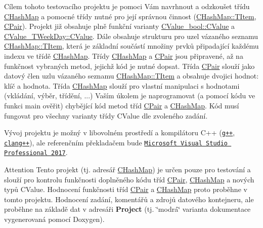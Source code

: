 Cílem tohoto testovacího projektu je pomoci Vám navrhnout a odzkoušet třídu {\ttfamily \hyperlink{class_c_hash_map}{C\+Hash\+Map}} a pomocné třídy nutné pro její správnou činnost ({\ttfamily \hyperlink{struct_c_hash_map_1_1_t_item}{C\+Hash\+Map\+::\+T\+Item}}, {\ttfamily \hyperlink{class_c_pair}{C\+Pair}}). Projekt již obsahuje plně funkční varianty {\ttfamily \hyperlink{class_c_value__bool_1_1_c_value}{C\+Value\+\_\+bool\+::\+C\+Value}} a {\ttfamily \hyperlink{class_c_value___t_week_day_1_1_c_value}{C\+Value\+\_\+\+T\+Week\+Day\+::\+C\+Value}}. Dále obsahuje strukturu pro uzel vázaného seznamu {\ttfamily \hyperlink{struct_c_hash_map_1_1_t_item}{C\+Hash\+Map\+::\+T\+Item}}, která je základní součástí množiny prvků připadající každému indexu ve třídě {\ttfamily \hyperlink{class_c_hash_map}{C\+Hash\+Map}}. Třídy {\ttfamily \hyperlink{class_c_hash_map}{C\+Hash\+Map}} a {\ttfamily \hyperlink{class_c_pair}{C\+Pair}} jsou připravené, až na funkčnost vybraných metod, jejichž kód je nutné dopsat. Třída {\ttfamily \hyperlink{class_c_pair}{C\+Pair}} slouží jako datový člen uzlu vázaného seznamu {\ttfamily \hyperlink{struct_c_hash_map_1_1_t_item}{C\+Hash\+Map\+::\+T\+Item}} a obsahuje dvojici hodnot\+: klíč a hodnota. Třída {\ttfamily \hyperlink{class_c_hash_map}{C\+Hash\+Map}} slouží pro vlastní manipulaci s hodnotami (vkládání, výběr, třídění, ...) Vaším úkolem je naprogramovat (a pomocí kódu ve funkci main ověřit) chybějící kód metod tříd {\ttfamily \hyperlink{class_c_pair}{C\+Pair}} a {\ttfamily \hyperlink{class_c_hash_map}{C\+Hash\+Map}}. Kód musí fungovat pro všechny varianty třídy C\+Value dle zvoleného zadání.

Vývoj projektu je možný v libovolném prostředí a kompilátoru C++ (\href{http://gcc.gnu.org/}{\tt g++}, \href{http://clang.llvm.org/}{\tt clang++}), ale referenčním překladačem bude \href{http://www.visualstudio.com/}{\tt Microsoft Visual Studio Professional 2017}.

\begin{DoxyAttention}{Attention}
Tento projekt (tj. adresář \hyperlink{class_c_hash_map}{C\+Hash\+Map}) je určen pouze pro testování a slouží pro kontrolu funkčnosti doplněného kódu tříd {\ttfamily \hyperlink{class_c_pair}{C\+Pair}}, {\ttfamily \hyperlink{class_c_hash_map}{C\+Hash\+Map}} a nových typů {\ttfamily C\+Value}. Hodnocení funkčnosti tříd {\ttfamily \hyperlink{class_c_pair}{C\+Pair}} a {\ttfamily \hyperlink{class_c_hash_map}{C\+Hash\+Map}} proto proběhne v tomto projektu. Hodnocení zadání, komentářů a zdrojů datového kontejneru, ale proběhne na základě dat v adresáři {\bfseries Project} (tj. \char`\"{}modrá\char`\"{} varianta dokumentace vygenerovaná pomocí Doxygen).
\end{DoxyAttention}
~\newline
